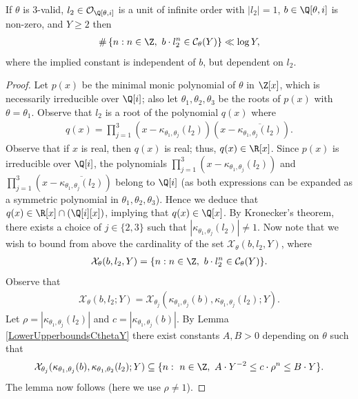 \documentclass[12pt]{amsart}
\newcommand{\1}{\mathmybb{1}}
\begin{document}
\begin{lem}
\label{modulusoneorbitbound}
If $\theta$ is 3-valid, $l_{2} \in \mathcal{O}_{\Q[\theta,i]}$ is a unit of infinite order with $|l_{2}| = 1$, $b \in \Q[\theta,i]$ is non-zero, and $Y \geq 2$ then 
\begin{align*}
\#\left\{n: n\in \Z, \ b\cdot l_{2}^n \in \mathcal{C}_{\theta}(Y) \right\} \ll \log Y,
\end{align*}
where the implied constant is independent of $b$, but dependent on $l_{2}$.
\end{lem}
\begin{proof}
Let $p(x)$ be the minimal monic polynomial of $\theta$ in $\Z[x]$, which is necessarily irreducible over $\Q[i]$; also let $\theta_{1},\theta_{2},\theta_{3}$ be the roots of $p(x)$ with $\theta = \theta_{1}$. Observe that $l_{2}$ is a root of the polynomial $q(x)$ where
\begin{align*}
q(x) = \prod_{j=1}^{3}\left(x-\kappa_{\theta_{1},\theta_{j}}(l_{2})\right)\left(x-\overline{\kappa_{\theta_{1},\theta_{j}}(l_{2})}\right).
\end{align*}
Observe that if $x$ is real, then $q(x)$ is real; thus, $q(x) \in \R[x]$. Since $p(x)$ is irreducible over $\Q[i]$, the polynomials $\prod_{j=1}^{3}\left(x-\kappa_{\theta_{1},\theta_{j}}(l_{2})\right)$ and $\prod_{j=1}^{3}\left(x-\overline{\kappa_{\theta_{1},\theta_{j}}(l_{2})}\right)$ belong to $\Q[i]$ (as both expressions can be expanded as a symmetric polynomial in $\theta_{1},\theta_{2},\theta_{3}$). Hence we deduce that $q(x) \in \R[x]\cap \left(\Q[i][x]\right)$, implying that $q(x) \in \Q[x]$. By Kronecker's theorem, there exists a choice of $j \in \{2,3\}$ such that $\left|\kappa_{\theta_{1},\theta_{j}}(l_{2})\right| \neq 1$. Now note that we wish to bound from above the cardinality of the set $\mathcal{X}_{\theta}(b,l_{2},Y)$, where
\begin{align*}
\mathcal{X}_{\theta}(b,l_{2},Y) = \{n: n \in \Z, \ b\cdot l_{2}^n \in \mathcal{C}_{\theta}(Y)\}.
\end{align*}
Observe that
\begin{align*}
\mathcal{X}_{\theta}(b,l_{2};Y)  = \mathcal{X}_{\theta_{j}}(\kappa_{\theta_{1},\theta_{j}}(b), \kappa_{\theta_{1},\theta_{j}}(l_{2});Y).
\end{align*}
Let $\rho = |\kappa_{\theta_{1},\theta_{j}}(l_{2})|$ and $c = |\kappa_{\theta_{1},\theta_{j}}(b)|$. By Lemma \ref{LowerUpperboundsCthetaY} there exist constants $A,B > 0$ depending on $\theta$ such that
\begin{align*}
\mathcal{X}_{\theta_{j}}(\kappa_{\theta_{1},\theta_{j}}(b), \kappa_{\theta_{1},\theta_{2}}(l_{2});Y) \subseteq \{n: \ n\in \Z, \ A\cdot Y^{-2} \leq c\cdot \rho^{n} \leq B \cdot Y\}.
\end{align*}
The lemma now follows (here we use $\rho \neq 1$).
\end{proof}
\end{document}
